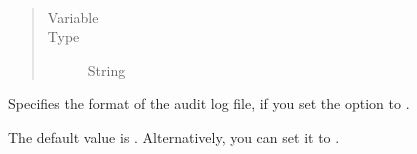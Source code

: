 \documentclass[letterpaper,10pt,english]{sphinxmanual}
\begin{document}
\begin{fulllineitems}
\label{\detokenize{audit-logging:cmdoption-auditFormat}}~\begin{quote}\begin{description}
\item[{Variable}] \leavevmode
\sphinxAtStartPar
{}

\item[{Type}] \leavevmode
\sphinxAtStartPar
String

\end{description}\end{quote}

\sphinxAtStartPar
Specifies the format of the audit log file,
if you set the {\hyperref[\detokenize{audit-logging:cmdoption-auditDestination}]{}} option to .

\sphinxAtStartPar
The default value is .
Alternatively, you can set it to .

\end{fulllineitems}

\end{document}
